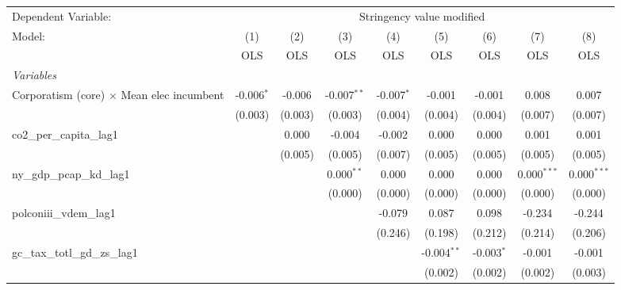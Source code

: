 
\begingroup
\centering
\begin{tabular}{lcccccccc}
   \toprule
   Dependent Variable: & \multicolumn{8}{c}{Stringency value modified}\\
   Model:                                           & (1)          & (2)     & (3)           & (4)          & (5)           & (6)          & (7)           & (8)\\  
                                                    &  OLS         & OLS     & OLS           & OLS          & OLS           & OLS          & OLS           & OLS\\  
   \midrule
   \emph{Variables}\\
   Corporatism (core) $\times$ Mean elec incumbent  & -0.006$^{*}$ & -0.006  & -0.007$^{**}$ & -0.007$^{*}$ & -0.001        & -0.001       & 0.008         & 0.007\\   
                                                    & (0.003)      & (0.003) & (0.003)       & (0.004)      & (0.004)       & (0.004)      & (0.007)       & (0.007)\\   
   co2\_per\_capita\_lag1                           &              & 0.000   & -0.004        & -0.002       & 0.000         & 0.000        & 0.001         & 0.001\\   
                                                    &              & (0.005) & (0.005)       & (0.007)      & (0.005)       & (0.005)      & (0.005)       & (0.005)\\   
   ny\_gdp\_pcap\_kd\_lag1                          &              &         & 0.000$^{**}$  & 0.000        & 0.000         & 0.000        & 0.000$^{***}$ & 0.000$^{***}$\\   
                                                    &              &         & (0.000)       & (0.000)      & (0.000)       & (0.000)      & (0.000)       & (0.000)\\   
   polconiii\_vdem\_lag1                            &              &         &               & -0.079       & 0.087         & 0.098        & -0.234        & -0.244\\   
                                                    &              &         &               & (0.246)      & (0.198)       & (0.212)      & (0.214)       & (0.206)\\   
   gc\_tax\_totl\_gd\_zs\_lag1                      &              &         &               &              & -0.004$^{**}$ & -0.003$^{*}$ & -0.001        & -0.001\\   
                                                    &              &         &               &              & (0.002)       & (0.002)      & (0.002)       & (0.003)\\   

\end{tabular}
